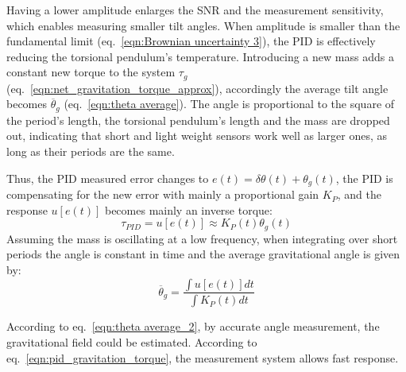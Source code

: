 \documentclass[\main/master.tex]{subfiles}
\begin{document}
\par\noindent
Having a lower amplitude enlarges the SNR and the measurement sensitivity, which enables measuring smaller tilt angles. When amplitude is smaller than the fundamental limit (eq.~\ref{eqn:Brownian uncertainty 3}), the PID is effectively reducing the torsional pendulum's temperature. Introducing a new mass adds a constant new torque to the system $\tau_g$ (eq.~\ref{eqn:net_gravitation_torque_approx}), accordingly the average tilt angle becomes $\overline{\theta}_g$ (eq.~\ref{eqn:theta average}). The angle is proportional to the square of the period's length, the torsional pendulum's length and the mass are dropped out, indicating that short and light weight sensors work well as larger ones, as long as their periods are the same. 
\par\noindent
Thus, the PID measured error  changes to $e(t) = \delta\theta(t) + \theta_g(t)$, the PID is compensating for the new error with mainly a proportional gain $K_P$, and the response $u[e(t)]$ becomes mainly an inverse torque:
\begin{equation}
\tau_{PID} = u[e(t)] \approx K_P(t)\theta_g(t) 
\label{eqn:PID_response}
\end{equation}
Assuming the mass is oscillating at a low frequency, when integrating over short periods the angle is constant in time and the average gravitational angle is given by:
\begin{equation}
\overline{\theta}_g = \frac{\int u[e(t)] dt}{\int K_P(t) dt}
\label{eqn:PID_measurement_eqn}
\end{equation}
\par\noindent
According to eq.~\ref{eqn:theta average_2}, by accurate angle measurement, the gravitational field could be estimated. According to eq.~\ref{eqn:pid_gravitation_torque}, the measurement system allows fast response. 

 
 
 
 
\end{document}
